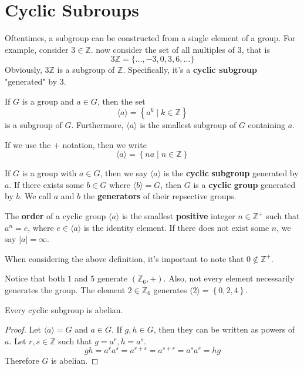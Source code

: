 \documentclass[12pt, letterpaper]{report}
\begin{document}
\section{Cyclic Subroups}
Oftentimes, a subgroup can be constructed from a single element of a group. For example, consider \(3\in\mathbb{Z} \). now consider the set of all multiples of 3, that is 
\[
	3\mathbb{Z} =\{ \ldots,-3,0,3,6,\ldots \} 
\]
Obviously, \(3\mathbb{Z} \) is a subgroup of \(\mathbb{Z}\). Specifically, it's a \textbf{cyclic subgroup} "generated" by 3. 
\begin{theorem}
	If \(G\) is a group and \(a\in G\), then the set 
	\[
		\langle a \rangle =\left\{ a^k \mid k\in\mathbb{Z}  \right\} 
	\]
	is a subgroup of \(G\). Furthermore, \(\langle a \rangle \) is the smallest subgroup of \(G\) containing \(a\).
\end{theorem}
\begin{remark}
	If we use the \(+\) notation, then we write 
	\[
		\langle a \rangle =\left\{ na \mid n\in\mathbb{Z}  \right\}
	\]
\end{remark}
\begin{definition}
	If \(G\) is a group with \(a\in G\), then we say \(\langle a \rangle \) is the \textbf{cyclic} \textbf{subgroup} generated by \(a\). If there exists some \(b\in G\) where \(\langle b \rangle =G\), then \(G\) is a \textbf{cyclic} \textbf{group} generated by \(b\). We call \(a\) and \(b\) the \textbf{generators} of their repsective groups.
\end{definition}
\begin{definition}
	The \textbf{order} of a cyclic group \(\langle a \rangle \) is the smallest \textbf{positive} integer \(n\in\mathbb{Z} ^+\) such that \(a^n =e\), where \(e\in \langle a \rangle \) is the identity element. If there does not exist some \(n\), we say \(|a| =\infty\).
\end{definition}
\begin{remark}
	When considering the above definition, it's important to note that \(0\notin \mathbb{Z} ^+\).
\end{remark}
\begin{eg}
	Notice that both \(1\) and \(5\) generate \(\left( \mathbb{Z} _6,+ \right) \). Also, not every element necessarily generates the group. The element \(2\in\mathbb{Z} _6\) generates \(\langle 2 \rangle =\left\{ 0,2,4 \right\} \).
\end{eg}

\begin{theorem}
	Every cyclic subgroup is abelian.
\end{theorem}
\begin{proof}
	Let \(\langle a \rangle =G\) and \(a\in G\). If \(g,h\in G\), then they can be written as powers of \(a\). Let \(r,s\in\mathbb{Z} \) such that \(g=a^r ,h=a^s\). 
	\[
		gh=a^r a^s=a^{r+s}=a^{s+r}=a^s a^r =hg   
	\]
	Therefore \(G\) is abelian.
\end{proof}
\end{document}
